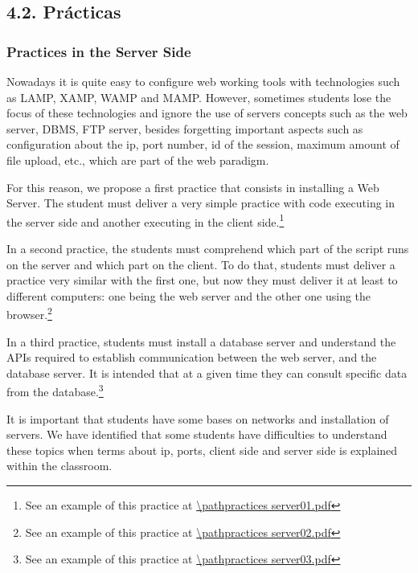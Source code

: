 \subsection{4.2. Prácticas}

\subsubsection{Practices in the Server Side}
Nowadays it is quite easy to configure web working tools with technologies such as LAMP, XAMP, WAMP 
and MAMP. However, sometimes students lose the focus of these technologies and ignore the use of 
servers concepts such as the web server, DBMS, FTP server, 
besides forgetting important aspects such as configuration about the ip, port number, id of the 
session, maximum amount of file upload, etc., which are part of the web paradigm.

For this reason, we propose a first practice that consists in installing a Web Server. 
The student must deliver a very simple practice with code executing in the server side and another 
executing in the client side.\footnote{See an example of this practice at 
    \url{\pathpractices server01.pdf}} 

In a second practice, the students must comprehend which part of the script runs on the server and which 
part on the client. To do that, students must deliver a practice very similar with the first one, but now
they must deliver it at least to different computers: one being the web server and the other one using
the browser.\footnote{See an example of this practice at 
    \url{\pathpractices server02.pdf}}

In a third practice, students must install a database server and understand the APIs required to 
establish communication between the web server, and the database server. It is intended that at a given 
time they can consult specific data from the database.\footnote{See an example of this practice at 
    \url{\pathpractices server03.pdf}}

It is important that students have some bases on networks and installation of servers. We have identified that
some students have difficulties to understand these topics when terms about ip, ports, client side and server side
is explained within the classroom.


